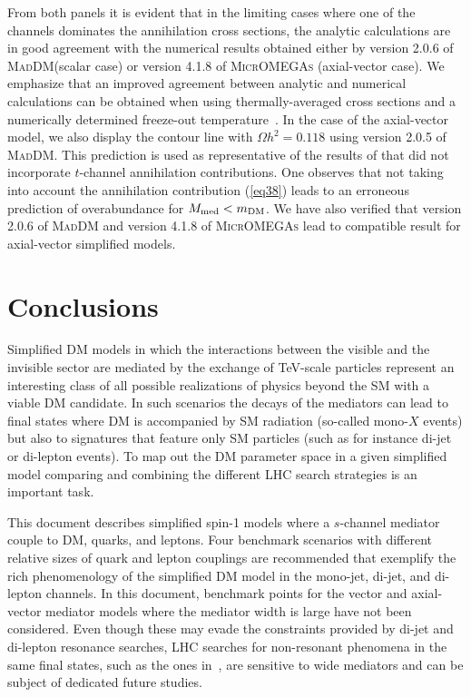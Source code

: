 \documentclass[review]{elsarticle}
\newcommand{\maddm}{\textsc{MadDM}\xspace}
\begin{document}
From both panels it is evident that in the limiting cases where one of the channels dominates the annihilation cross sections, the analytic calculations are in good agreement with the numerical results obtained either by version 2.0.6 of \maddm (scalar case) or version 4.1.8 of \textsc{MicrOMEGAs} (axial-vector case). We emphasize that an improved agreement between analytic and numerical calculations can be obtained when using thermally-averaged cross sections and a numerically determined freeze-out temperature~\cite{Gondolo:1990dk}. In the case of the axial-vector model, we also display the contour line with $\Omega h^2 = 0.118$ using version 2.0.5 of \maddm. This prediction is used as representative of the results of \cite{Pree:2016hwc} that did not incorporate $t$-channel annihilation contributions. One observes that not taking into account the annihilation  contribution (\ref{eq38}) leads to an erroneous prediction of overabundance for $M_{\rm med} < m_{\rm DM}$. We have also verified that version 2.0.6 of \maddm and version 4.1.8 of \textsc{MicrOMEGAs} lead to compatible result for axial-vector simplified models. 


\section{Conclusions}

Simplified DM models in which the interactions between the visible and the invisible sector are mediated by the exchange of TeV-scale particles represent an interesting class of all  possible realizations of physics beyond the SM with a  viable DM candidate. In such scenarios the decays of the mediators can lead to final states where DM is  accompanied by SM radiation (so-called mono-$X$ events) but also to signatures that feature only SM particles (such as for instance di-jet or di-lepton events). To map out the DM parameter space in a given simplified model comparing and combining the different LHC search strategies is an important task. 

This document describes simplified spin-1 models where a $s$-channel mediator couple to DM, quarks, and leptons. Four benchmark scenarios with  different relative sizes of quark and lepton couplings are recommended that exemplify the rich phenomenology of the simplified DM model in the mono-jet, di-jet, and di-lepton channels. In this document, benchmark points for the vector and axial-vector mediator models where the mediator width is large have not been considered. Even though these may evade the constraints provided by di-jet and di-lepton resonance searches, LHC searches for non-resonant phenomena in the same final states, such as the ones in~\cite{ATLAS:2015nsi,Sirunyan:2017ygf,Aad:2014wca, Khachatryan:2015scf}, are sensitive to wide mediators and can be subject of dedicated future studies.
\end{document}
